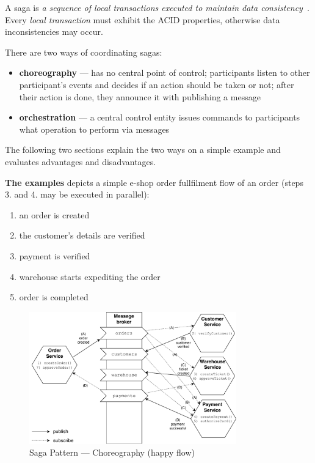 \documentclass[thesis=M,english,hidelinks]{FITthesis}[2012/10/20]
\begin{document}
A saga is \textit{a sequence of local transactions executed to maintain data consistency}~\cite{sagas}. Every \textit{local transaction} must exhibit the \acrshort{ACID} properties, otherwise data inconsistencies may occur.

\vspace{1em}
\noindent
There are two ways of coordinating sagas:
\begin{itemize}
    \item \textbf{choreography} --- has no central point of control; participants listen to other participant's events and decides if an action should be taken or not; after their action is done, they announce it with publishing a message
    \item \textbf{orchestration} --- a central control entity issues commands to participants what operation to perform via messages
\end{itemize}

The following two sections explain the two ways on a simple example and evaluates advantages and disadvantages.

\vspace{1em}
\noindent
\textbf{The examples} depicts a simple e-shop order fullfilment flow of an order (steps 3. and 4. may be executed in parallel):
\begin{multicols}{2}
   \begin{enumerate}[noitemsep]
        \item an order is created
        \item the customer's details are verified
        \item payment is verified
        \item warehouse starts expediting the order
        \item order is completed
    \end{enumerate} 
\end{multicols}

\begin{figure}[!ht]
  \centering
    \includegraphics[width=0.8\textwidth]{images/saga-chor-happy.pdf}
    \caption{Saga Pattern --- Choreography (happy flow)}
    \label{fig:saga-chor-happy}
\end{figure}
\end{document}
